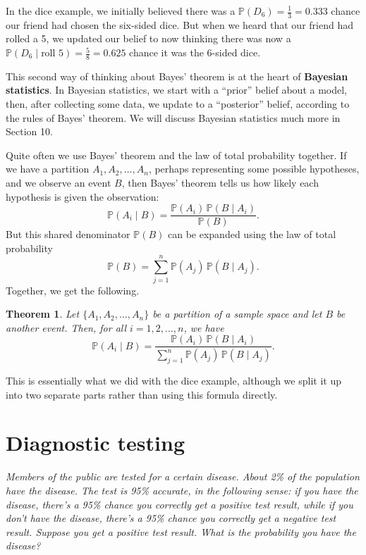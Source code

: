 \documentclass[
  a4paper,
]{book}
\newtheorem{theorem}{Theorem}[chapter]
\theoremstyle{definition}
\theoremstyle{definition}
\theoremstyle{definition}
\theoremstyle{definition}
\theoremstyle{remark}
\begin{document}
In the dice example, we initially believed there was a \(\mathbb P(D_6) = \frac13 = 0.333\) chance our friend had chosen the six-sided dice. But when we heard that our friend had rolled a 5, we updated our belief to now thinking there was now a \(\mathbb P(D_6 \mid \text{roll 5}) =\frac58 = 0.625\) chance it was the 6-sided dice.

This second way of thinking about Bayes' theorem is at the heart of \textbf{Bayesian statistics}. In Bayesian statistics, we start with a ``prior'' belief about a model, then, after collecting some data, we update to a ``posterior'' belief, according to the rules of Bayes' theorem. We will discuss Bayesian statistics much more in Section 10.

Quite often we use Bayes' theorem and the law of total probability together. If we have a partition \(A_1, A_2, \dots, A_n\), perhaps representing some possible hypotheses, and we observe an event \(B\), then Bayes' theorem tells us how likely each hypothesis is given the observation:
\[ \mathbb P(A_i \mid B) = \frac{\mathbb P(A_i) \,\mathbb P(B \mid A_i)}{\mathbb P(B)} .  \]
But this shared denominator \(\mathbb P(B)\) can be expanded using the law of total probability
\[ \mathbb P(B) = \sum_{j=1}^n \mathbb P(A_j) \,\mathbb P(B \mid A_j) . \]
Together, we get the following.

\begin{theorem}
\protect\hypertarget{thm:bayes-total}{}\label{thm:bayes-total}Let \(\{A_1, A_2, \dots, A_n\}\) be a partition of a sample space and let \(B\) be another event. Then, for all \(i=1,2,\dots,n\), we have
\[ \mathbb P(A_i \mid B) = \frac{\mathbb P(A_i) \,\mathbb P(B \mid A_i)}{\sum_{j=1}^n \mathbb P(A_j) \, \mathbb P(B \mid A_j)} .  \]
\end{theorem}

This is essentially what we did with the dice example, although we split it up into two separate parts rather than using this formula directly.

\hypertarget{screening}{%
\section{Diagnostic testing}\label{screening}}

\emph{Members of the public are tested for a certain disease. About 2\% of the population have the disease. The test is 95\% accurate, in the following sense: if you have the disease, there's a 95\% chance you correctly get a positive test result, while if you don't have the disease, there's a 95\% chance you correctly get a negative test result. Suppose you get a positive test result. What is the probability you have the disease?}
\end{document}
